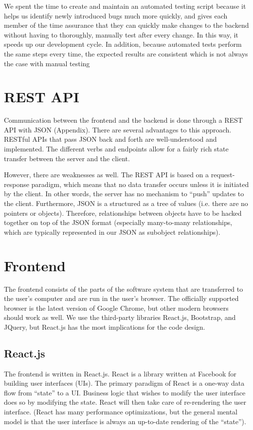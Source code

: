 \documentclass[12pt]{article}
\begin{document}
We spent the time to create and maintain an automated testing script because it helps us identify newly introduced bugs much more quickly, and gives each member of the time assurance that they can quickly make changes to the backend without having to thoroughly, manually test after every change. In this way, it speeds up our development cycle. In addition, because automated tests perform the same steps every time, the expected results are consistent which is not always the case with manual testing

\section{REST API}
Communication between the frontend and the backend is done through a REST API with JSON (Appendix). There are several advantages to this approach. RESTful APIs that pass JSON back and forth are well-understood and implemented. The different verbs and endpoints allow for a fairly rich state transfer between the server and the client.

However, there are weaknesses as well. The REST API is based on a request-response paradigm, which means that no data transfer occurs unless it is initiated by the client. In other words, the server has no mechanism to ``push'' updates to the client. Furthermore, JSON is a structured as a tree of values (i.e. there are no pointers or objects). Therefore, relationships between objects have to be hacked together on top of the JSON format (especially many-to-many relationships, which are typically represented in our JSON as subobject relationships).

\section{Frontend}
The frontend consists of the parts of the software system that are transferred to the user's computer and are run in the user's browser. The officially supported browser is the latest version of Google Chrome, but other modern browsers should work as well. We use the third-party libraries React.js, Bootstrap, and JQuery, but React.js has the most implications for the code design.

\subsection{React.js}
The frontend is written in React.js. React is a library written at Facebook for building user interfaces (UIs). The primary paradigm of React is a one-way data flow from ``state'' to a UI. Business logic that wishes to modify the user interface does so by modifying the state. React will then take care of re-rendering the user interface. (React has many performance optimizations, but the general mental model is that the user interface is always an up-to-date rendering of the ``state'').
\end{document}
